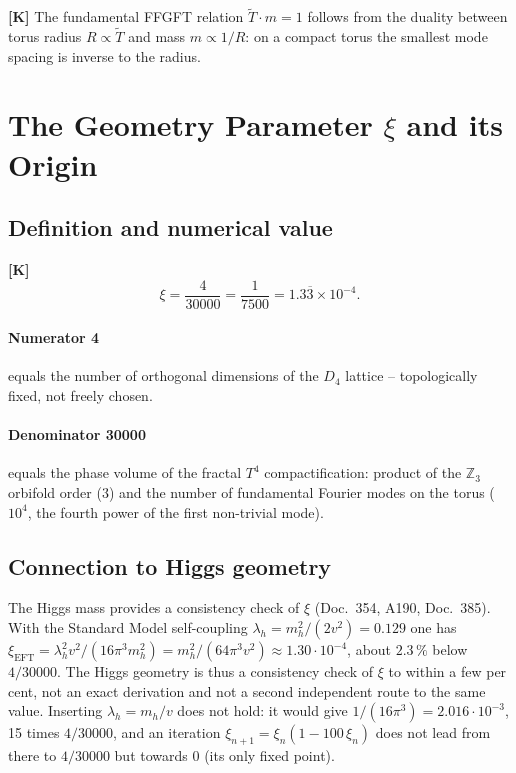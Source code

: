 \textbf{[K]} The fundamental FFGFT relation
$\tilde{T}\cdot m = 1$
follows from the duality between torus radius $R \propto \tilde{T}$
and mass $m \propto 1/R$: on a compact torus the smallest mode spacing
is inverse to the radius.

\section{The Geometry Parameter $\xi$ and its Origin}

\subsection{Definition and numerical value}

\textbf{[K]}
\begin{equation}
  \xi = \frac{4}{30000} = \frac{1}{7500}
      = 1.3\overline{3}\times10^{-4}.
  \label{eq:xi_def}
\end{equation}

\paragraph{Numerator 4} equals the number of orthogonal dimensions of
the $D_4$ lattice -- topologically fixed, not freely chosen.

\paragraph{Denominator 30000} equals the phase volume of the fractal
$T^4$ compactification: product of the $\mathbb{Z}_3$ orbifold order
($3$) and the number of fundamental Fourier modes on the torus
($10^4$, the fourth power of the first non-trivial mode).

\subsection{Connection to Higgs geometry}

The Higgs mass provides a consistency check of $\xi$ (Doc.~354, A190,
Doc.~385). With the Standard Model self-coupling
$\lambda_h = m_h^2/(2v^2) = 0.129$ one has
$\xi_{\text{EFT}} = \lambda_h^2 v^2 / (16\pi^3 m_h^2) = m_h^2/(64\pi^3v^2)
\approx 1.30\cdot10^{-4}$, about $2.3\,\%$ below $4/30000$. The Higgs
geometry is thus a consistency check of $\xi$ to within a few per cent,
not an exact derivation and not a second independent route to the same
value. Inserting $\lambda_h = m_h/v$ does not hold: it would give
$1/(16\pi^3) = 2.016\cdot10^{-3}$, 15 times $4/30000$, and an iteration
$\xi_{n+1} = \xi_n(1-100\,\xi_n)$ does not lead from there to $4/30000$
but towards 0 (its only fixed point).


